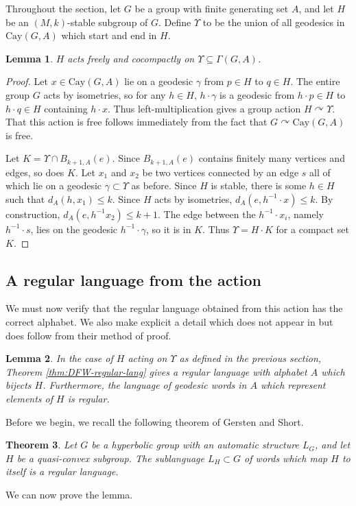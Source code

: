 \documentclass[10pt,a4paper]{amsart}
\newtheorem{theorem}{Theorem}[section]
\newtheorem{lemma}[theorem]{Lemma}
\begin{document}
Throughout the section, let $G$ be a group with finite generating set $A$, and let $H$ be an $(M,k)$-stable subgroup of $G$. Define $\Upsilon$ to be the union of all geodesics in $\text{Cay}(G,A)$ which start and end in $H$. 
\begin{lemma}
    $H$ acts freely and cocompactly on $\Upsilon \subseteq \Gamma(G,A)$.
\end{lemma}
\begin{proof}
    Let $x \in \text{Cay}(G,A)$ lie on a geodesic $\gamma$ from $p \in H$ to $q \in H$. The entire group $G$ acts by isometries, so for any $h \in H$, $h \cdot \gamma$ is a geodesic from $h \cdot p \in H$ to $h \cdot q \in H$ containing $h \cdot x$. Thus left-multiplication gives a group action $H \curvearrowright \Upsilon$. That this action is free follows immediately from the fact that $G \curvearrowright \text{Cay}(G,A)$ is free.
    
    Let $K = \Upsilon \cap B_{k+1, A}(e)$. Since $B_{k+1, A}(e)$ contains finitely many vertices and edges, so does $K$. Let $x_1$ and $x_2$ be two vertices connected by an edge $s$ all of which lie on a geodesic $\gamma \subset \Upsilon$ as before. Since $H$ is stable, there is some $h \in H$ such that $d_A (h, x_1) \leq k$. Since $H$ acts by isometries, $d_A (e, h^{-1} \cdot x) \leq k$. By construction, $d_A (e , h^{-1} x_2) \leq k+1$. The edge between the $h^{-1} \cdot x_i$, namely $h^{-1} \cdot s$, lies on the geodesic $h^{-1} \cdot \gamma$, so it is in $K$. Thus $\Upsilon = H \cdot K$ for a compact set $K$.
\end{proof}

\subsection{A regular language from the action}\label{subsec:regular-language-alphabet}
    We must now verify that the regular language obtained from this action has the correct alphabet. We also make explicit a detail which does not appear in \cite[Theorem~6.7]{DFW} but does follow from their method of proof.
    \begin{lemma}\label{lem:right-alphabet}
        In the case of $H$ acting on $\Upsilon$ as defined in the previous section, Theorem \ref{thm:DFW-regular-lang} gives a regular language with alphabet $A$ which bijects $H$. Furthermore, the language of geodesic words in $A$ which represent elements of $H$ is regular.
    \end{lemma}

    Before we begin, we recall the following theorem of Gersten and Short.
    \begin{theorem}\cite[Theorem~2.2]{Gersten-Short}
        Let $G$ be a hyperbolic group with an automatic structure $L_G$, and let $H$ be a quasi-convex subgroup. The sublanguage $L_H \subset G$ of words which map $H$ to itself is a regular language.
    \end{theorem}
    We can now prove the lemma.
\end{document}
